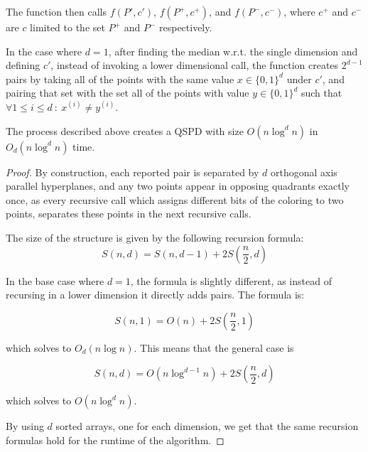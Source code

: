 \documentclass[12pt]{article}%
\begin{document}
The function then calls $f(P', c')$, $f(P^+, c^+)$, and $f(P^-, c^-)$,
where $c^+$ and $c^-$ are $c$ limited to the set $P^+$ and $P^-$
respectively.

In the case where $d=1$, after finding the median w.r.t. the single
dimension and defining $c'$, instead of invoking a lower dimensional
call, the function creates $2^{d-1}$ pairs by taking all of the points
with the same value $x\in\{0,1\}^d$ under $c'$, and pairing that set
with the set all of the points with value $y\in\{0,1\}^d$ such that
$\forall 1\leq i\leq d~:~ x^{(i)}\neq y^{(i)}$.


\begin{claim}
    The process described above creates a QSPD with size $O(n\log^dn)$
    in $O_d(n\log^dn)$ time.
\end{claim}

\begin{proof}
    By construction, each reported pair is separated by $d$ orthogonal
    axis parallel hyperplanes, and any two points appear in opposing
    quadrants exactly once, as every recursive call which assigns
    different bits of the coloring to two points, separates these
    points in the next recursive calls.
	
    The size of the structure is given by the following recursion
    formula:
    \begin{equation}
        S(n,d) = S(n,d-1) + 2S\left(\frac{n}{2},d\right)
    \end{equation}
	
    In the base case where $d=1$, the formula is slightly different,
    as instead of recursing in a lower dimension it directly adds
    pairs. The formula is:
	
	\begin{equation}
            S(n,1) = O(n) + 2S\left(\frac{n}{2},1\right)
        \end{equation}
	
	which solves to $O_d(n\log n)$. This means that the general
        case is
	
	\begin{equation}
            S(n,d) = O(n\log^{d-1}n) + 2S\left(\frac{n}{2},d\right)
        \end{equation}
	
	which solves to $O(n\log^d n)$.
	
	By using $d$ sorted arrays, one for each dimension, we get
        that the same recursion formulas hold for the runtime of the
        algorithm.
    \end{proof}
\end{document}
